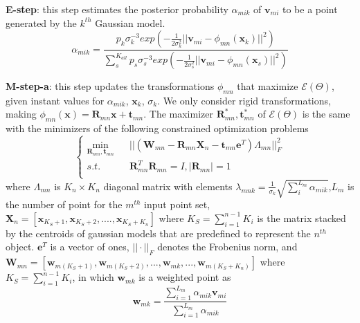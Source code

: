 \noindent\textbf{E-step}:
this step estimates the posterior probability $\alpha_{mik}$ of $\pmb v_{mi}$ to be a point generated by the $k^{th}$ Gaussian model.
%
\begin{equation}
\label{equ:estep}
\alpha_{mik}=\frac{p_k\sigma_k^{-3}exp(-\frac{1}{2\sigma_k^2}||\pmb v_{mi}-\phi_{mn}(\pmb x_k)||^2)}{\sum_s^{K_{all}}p_s\sigma_s^{-3}exp(-\frac{1}{2\sigma_s^2}||\pmb v_{mi}-\phi_{mn}(\pmb x_s)||^2)}
\end{equation}
%


\noindent\textbf{M-step-a}: this step updates the transformations $\phi_{mn}$ that maximize $\mathcal{E}(\Theta)$, given instant values for $\alpha_{mik}$, $\pmb{x}_k$, $\sigma_k$.
%
We only consider rigid transformations, making  $\phi_{mn}(\pmb{x})=\mathbf{R}_{mn}\pmb{x}+\mathbf{t}_{mn}$. The maximizer $\mathbf{R}_{mn}^*,\mathbf{t}_{mn}^*$ of $\mathcal{E}(\Theta)$ is the same with the minimizers of the following constrained optimization problems
%
\begin{equation}
\left\{
\begin{array}{rcl}
\min_{\mathbf{R}_{mn},\pmb{t}_{mn}}&      &||(\mathbf{W}_{mn}-\mathbf{R}_{mn}\mathbf{X}_n-\pmb t_{mn}\mathbf{e}^T)\Lambda_{mn}||_F^2\\
s.t.&      &\mathbf{R}_{mn}^T\mathbf{R}_{mn}=I, |\mathbf{R}_{mn}|=1\\
\end{array} \right.
\end{equation}
where $\Lambda_{mn}$ is $K_n \times K_n$ diagonal matrix with elements $\lambda_{mnk}=\frac{1}{\sigma_k}\sqrt{\sum_i^{L_{m}}\alpha_{mik}}$,$L_m$ is the number of point for the $m^{th}$ input point set, $\mathbf{X}_n = [\pmb{x}_{K_S+1}, \pmb{x}_{K_S+2},...., \pmb{x}_{K_S+K_n}]$ where $K_S = \sum_{i=1}^{n-1}K_i$ is the matrix stacked by the centroids of gaussian models that are predefined to represent the $n^{th}$ object. $\mathbf{e}^T$ is a vector of ones, $||\cdot||_F$ denotes the Frobenius norm, and $\mathbf{W}_{mn}=[\pmb{w}_{m(K_S+1)},\pmb{w}_{m(K_S+2)},...,\pmb{w}_{mk},...,\pmb{w}_{m(K_S+K_n)}]$ where $K_S = \sum_{i=1}^{n-1}K_i$, in which $\pmb{w}_{mk}$ is a weighted point as
%
\begin{equation}
\pmb{w}_{mk}=\frac{\sum_{i=1}^{L_m}\alpha_{mik} \pmb{v}_{mi}}{\sum_{i=1}^{L_m}\alpha_{mik}}
\end{equation}

